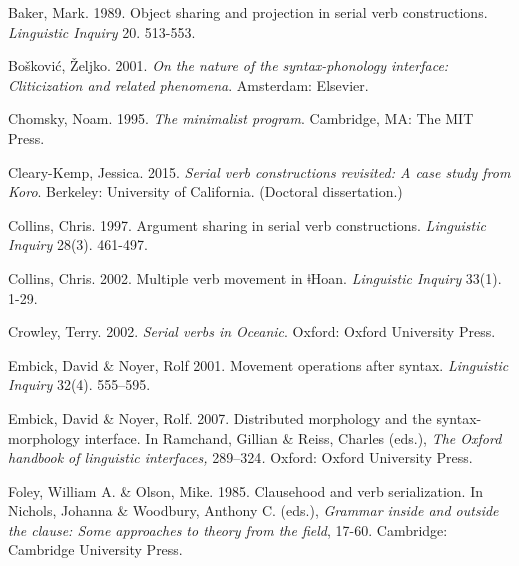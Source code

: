 \begin{styleNoSpacing}
Baker, Mark. 1989. Object sharing and projection in serial verb constructions. \textit{Linguistic Inquiry} 20. 513-553.
\end{styleNoSpacing}

\begin{styleNoSpacing}
Bošković, Željko. 2001. \textit{On the nature of the syntax-phonology interface: Cliticization and related phenomena}. Amsterdam: Elsevier.
\end{styleNoSpacing}

\begin{styleNoSpacing}
Chomsky, Noam. 1995. \textit{The minimalist program}. Cambridge, MA: The MIT Press.
\end{styleNoSpacing}

Cleary-Kemp, Jessica. 2015. \textit{Serial verb constructions revisited: A case study from Koro}. Berkeley: University of California. (Doctoral dissertation.) 

Collins, Chris. 1997. Argument sharing in serial verb constructions. \textit{Linguistic Inquiry} 28(3). 461-497.

\begin{styleNoSpacing}
Collins, Chris. 2002. Multiple verb movement in ǂHoan. \textit{Linguistic Inquiry} 33(1). 1-29.
\end{styleNoSpacing}

\begin{styleNoSpacing}
Crowley, Terry. 2002. \textit{Serial verbs in Oceanic}. Oxford: Oxford University Press.
\end{styleNoSpacing}

\begin{styleNoSpacing}
Embick, David \& Noyer, Rolf 2001. Movement operations after syntax. \textit{Linguistic Inquiry} 32(4). 555–595.
\end{styleNoSpacing}

\begin{styleNoSpacing}
Embick, David \& Noyer, Rolf. 2007. Distributed morphology and the syntax-morphology interface. In Ramchand, Gillian \& Reiss, Charles (eds.), \textit{The Oxford handbook of linguistic interfaces, }289–324\textit{. }Oxford: Oxford University Press.
\end{styleNoSpacing}

\begin{styleNoSpacing}
Foley, William A. \& Olson, Mike. 1985. Clausehood and verb serialization. In Nichols, Johanna \& Woodbury, Anthony C. (eds.), \textit{Grammar inside and outside the clause: Some approaches to theory from the field}, 17-60. Cambridge: Cambridge University Press. 
\end{styleNoSpacing}

